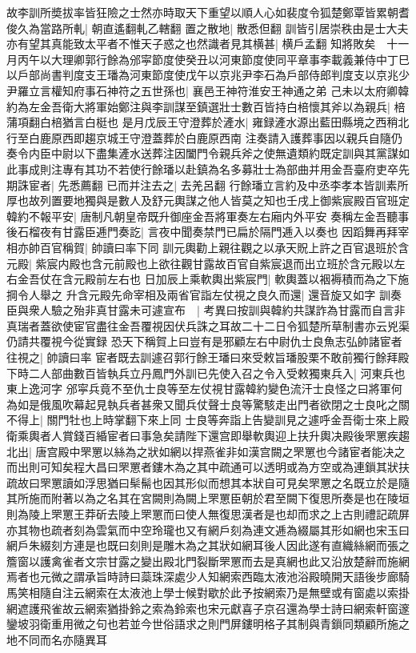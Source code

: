 故李訓所奬拔率皆狂險之士然亦時取天下重望以順人心如裴度令狐楚鄭覃皆累朝耆俊久為當路所軋|{
	朝直遙翻軋乙轄翻}
置之散地|{
	散悉但翻}
訓皆引居崇秩由是士大夫亦有望其真能致太平者不惟天子惑之也然識者見其横甚|{
	横戶孟翻}
知將敗矣　十一月丙午以大理卿郭行餘為邠寜節度使癸丑以河東節度使同平章事李載義兼侍中丁巳以戶部尚書判度支王璠為河東節度使戊午以京兆尹李石為戶部侍郎判度支以京兆少尹羅立言權知府事石神符之五世孫也|{
	襄邑王神符淮安王神通之弟}
己未以太府卿韓約為左金吾衛大將軍始鄭注與李訓謀至鎮選壯士數百皆持白棓懷其斧以為親兵|{
	棓蒲項翻白棓猶言白梃也}
是月戊辰王守澄葬於滻水|{
	雍録滻水源出藍田縣境之西稍北行至白鹿原西即趨京城王守澄蓋葬於白鹿原西南}
注奏請入護葬事因以親兵自隨仍奏令内臣中尉以下盡集滻水送葬注因闔門令親兵斧之使無遺類約既定訓與其黨謀如此事成則注專有其功不若使行餘璠以赴鎮為名多募壯士為部曲并用金吾臺府吏卒先期誅宦者|{
	先悉薦翻}
已而并注去之|{
	去羌呂翻}
行餘璠立言約及中丞李孝本皆訓素所厚也故列置要地獨與是數人及舒元輿謀之他人皆莫之知也壬戌上御紫宸殿百官班定韓約不報平安|{
	唐制凡朝皇帝既升御座金吾將軍奏左右廂内外平安}
奏稱左金吾聽事後石榴夜有甘露臣逓門奏訖|{
	言夜中聞奏禁門已扁於隔門逓入以奏也}
因蹈舞再拜宰相亦帥百官稱賀|{
	帥讀曰率下同}
訓元輿勸上親往觀之以承天貺上許之百官退班於含元殿|{
	紫宸内殿也含元前殿也上欲往觀甘露故百官自紫宸退而出立班於含元殿以左右金吾仗在含元殿前左右也}
日加辰上乘軟輿出紫宸門|{
	軟輿蓋以裀褥積而為之下施掆令人舉之}
升含元殿先命宰相及兩省官詣左仗視之良久而還|{
	還音旋又如字}
訓奏臣與衆人驗之殆非真甘露未可遽宣布　|{
	考異曰按訓與韓約共謀詐為甘露而自言非真瑞者蓋欲使宦官盡往金吾覆視因伏兵誅之耳故二十二日令狐楚所草制書亦云兇渠仍請共覆視今從實録}
恐天下稱賀上曰豈有是邪顧左右中尉仇士良魚志弘帥諸宦者往視之|{
	帥讀曰率}
宦者既去訓遽召郭行餘王璠曰來受敕旨璠股栗不敢前獨行餘拜殿下時二人部曲數百皆執兵立丹鳳門外訓已先使入召之令入受敕獨東兵入|{
	河東兵也東上逸河字}
邠寜兵竟不至仇士良等至左仗視甘露韓約變色流汗士良怪之曰將軍何為如是俄風吹幕起見執兵者甚衆又聞兵仗聲士良等驚駭走出門者欲閉之士良叱之關不得上|{
	關門牡也上時掌翻下來上同}
士良等奔詣上告變訓見之遽呼金吾衛士來上殿衛乘輿者人賞錢百緍宦者曰事急矣請陛下還宫即舉軟輿迎上扶升輿决殿後罘罳疾趨北出|{
	唐宫殿中罘罳以絲為之狀如網以捍燕雀非如漢宫闕之罘罳也今諸宦者能决之而出則可知矣程大昌曰罘罳者鏤木為之其中疏通可以透明或為方空或為連鎻其狀扶疏故曰罘罳讀如浮思猶曰䯱髵也因其形似而想其本狀自可見矣罘罳之名既立於是隨其所施而附著以為之名其在宮闕則為闕上罘罳臣朝於君至闕下復思所奏是也在陵垣則為陵上罘罳王莽斫去陵上罘罳而曰使人無復思漢者是也却而求之上古則禮記疏屏亦其物也疏者刻為雲氣而中空玲瓏也又有網戶刻為連文逓為綴屬其形如網也宋玉曰網戶朱綴刻方連是也既曰刻則是雕木為之其狀如網耳後人因此遂有直織絲網而張之簷窗以護禽雀者文宗甘露之變出殿北門裂斷罘罳而去是真網也此又沿放楚辭而施網焉者也元微之謂承旨時詩曰蘂珠深處少人知網索西臨太液池浴殿曉開天語後步廊騎馬笑相隨自注云網索在太液池上學士候對歇於此予按網索乃是無壁或有窗處以索掛網遮護飛雀故云網索猶掛鈴之索為鈴索也宋元獻喜子京召還為學士詩曰網索軒窗邃鑾坡羽衛重用微之句也若並今世俗語求之則門屏鏤明格子其制與青鎻同類顧所施之地不同而名亦隨異耳}
